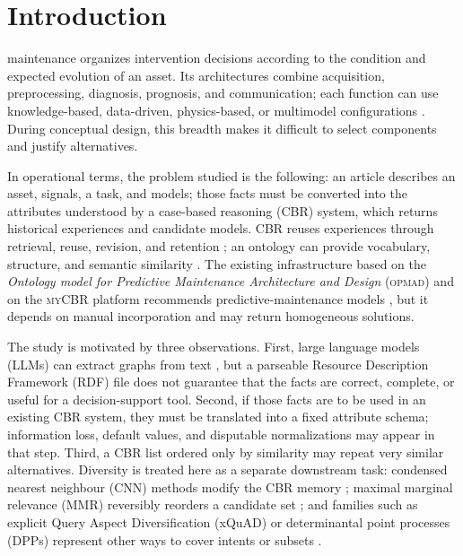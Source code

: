 \documentclass[journal]{IEEEtran}
\newcommand{\OPMAD}{\textsc{opmad}}
\newcommand{\myCBR}{\textsc{myCBR}}
\begin{document}
\section{Introduction}
\label{sec:intro}

 maintenance organizes intervention decisions according to the condition and expected evolution of an asset. Its architectures combine acquisition, preprocessing, diagnosis, prognosis, and communication; each function can use knowledge-based, data-driven, physics-based, or multimodel configurations \cite{MonteroJimenez2020Survey}. During conceptual design, this breadth makes it difficult to select components and justify alternatives.

In operational terms, the problem studied is the following: an article describes an asset, signals, a task, and models; those facts must be converted into the attributes understood by a case-based reasoning (CBR) system, which returns historical experiences and candidate models. CBR reuses experiences through retrieval, reuse, revision, and retention \cite{Aamodt1994CBR,LopezDeMantaras2005CBR}; an ontology can provide vocabulary, structure, and semantic similarity \cite{Gruber1993Ontology,AmailefLu2013OntologyCBR,Qin2018OntologyCBR}. The existing infrastructure based on the \emph{Ontology model for Predictive Maintenance Architecture and Design} (\OPMAD{}) and on the \myCBR{} platform recommends predictive-maintenance models \cite{MonteroJimenez2021OPMADCBR,MunozHernandez2021OntologyCBR}, but it depends on manual incorporation and may return homogeneous solutions.

The study is motivated by three observations. First, large language models (LLMs) can extract graphs from text \cite{Pan2024LLMKG,Lairgi2024IText2KG}, but a parseable Resource Description Framework (RDF) file does not guarantee that the facts are correct, complete, or useful for a decision-support tool. Second, if those facts are to be used in an existing CBR system, they must be translated into a fixed attribute schema; information loss, default values, and disputable normalizations may appear in that step. Third, a CBR list ordered only by similarity may repeat very similar alternatives. Diversity is treated here as a separate downstream task: condensed nearest neighbour (CNN) methods modify the CBR memory \cite{MunozPena2025Diversity}; maximal marginal relevance (MMR) reversibly reorders a candidate set \cite{CarbonellGoldstein1998MMR}; and families such as explicit Query Aspect Diversification (xQuAD) or determinantal point processes (DPPs) represent other ways to cover intents or subsets \cite{Santos2010xQuAD,Gan2020DPP}.
\end{document}
